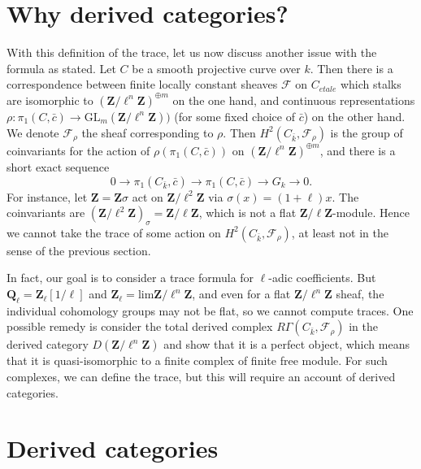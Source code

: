 \section{Why derived categories?}
\label{section-derived-categories-why}

\noindent
With this definition of the trace, let us now discuss another issue with the
formula as stated. Let $C$ be a smooth projective curve over $k$. Then there is
a correspondence between finite locally constant sheaves $\mathcal{F}$ on
$C_{etale}$ which stalks are isomorphic to
${(\mathbf{Z}/\ell^n\mathbf{Z})}^{\oplus m}$ on the one hand, and continuous
representations $\rho : \pi_1 (C,\bar c) \to
\text{GL}_m(\mathbf{Z}/\ell^n\mathbf{Z}))$ (for some fixed choice of $\bar c$)
on the other hand. We denote $\mathcal{F}_\rho$ the sheaf corresponding to
$\rho$. Then $H^2 (C_{\bar k}, \mathcal{F}_\rho)$ is the group of coinvariants
for the action of $\rho(\pi_1 (C,\bar c))$ on
${(\mathbf{Z}/\ell^n\mathbf{Z})}^{\oplus m}$, and there is a short exact
sequence
$$
0 \longrightarrow \pi_1 (C_{\bar k},\bar c) \longrightarrow \pi_1 (C,\bar c)
\longrightarrow G_k \longrightarrow 0.
$$
For instance, let $\mathbf{Z} = \mathbf{Z} \sigma$ act on
$\mathbf{Z}/\ell^2\mathbf{Z}$ via $\sigma(x) = (1+\ell) x$. The coinvariants
are $(\mathbf{Z}/\ell^2\mathbf{Z})_{\sigma} = \mathbf{Z}/\ell\mathbf{Z}$, which
is not a flat $\mathbf{Z}/\ell\mathbf{Z}$-module. Hence we cannot take the
trace of some action on $H^2(C_{\bar k}, \mathcal{F}_\rho)$, at least not in
the sense of the previous section.

\medskip\noindent
In fact, our goal is to consider a trace formula for $\ell$-adic coefficients.
But $\mathbf{Q}_\ell = \mathbf{Z}_\ell[1/\ell]$ and $\mathbf{Z}_\ell =
\text{lim} \mathbf{Z}/\ell^n\mathbf{Z}$, and even for a flat
$\mathbf{Z}/\ell^n\mathbf{Z}$ sheaf, the individual cohomology groups may not
be flat, so we cannot compute traces. One possible remedy is consider the total
derived complex $R\Gamma(C_{\bar k}, \mathcal{F}_\rho)$ in the derived category
$D(\mathbf{Z}/\ell^n\mathbf{Z})$ and show that it is a perfect object, which
means that it is quasi-isomorphic to a finite complex of finite free module.
For such complexes, we can define the trace, but this will require an account
of derived categories.






\section{Derived categories}
\label{section-derived-categories}

